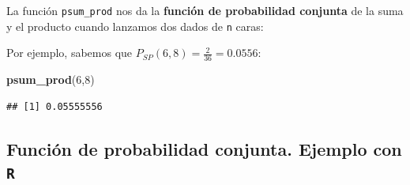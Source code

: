 \documentclass[]{book}
\newenvironment{Shaded}{\begin{snugshade}}{\end{snugshade}}
\newcommand{\ControlFlowTok}[1]{\textcolor[rgb]{0.13,0.29,0.53}{\textbf{#1}}}
\newcommand{\DataTypeTok}[1]{\textcolor[rgb]{0.13,0.29,0.53}{#1}}
\newcommand{\DecValTok}[1]{\textcolor[rgb]{0.00,0.00,0.81}{#1}}
\newcommand{\KeywordTok}[1]{\textcolor[rgb]{0.13,0.29,0.53}{\textbf{#1}}}
\newcommand{\NormalTok}[1]{#1}
\newcommand{\OperatorTok}[1]{\textcolor[rgb]{0.81,0.36,0.00}{\textbf{#1}}}
\newcommand{\StringTok}[1]{\textcolor[rgb]{0.31,0.60,0.02}{#1}}
\begin{document}
La función \texttt{psum\_prod} nos da la \textbf{función de probabilidad conjunta} de la suma y el producto cuando lanzamos dos dados de \texttt{n} caras:

\begin{Shaded}
\end{Shaded}

Por ejemplo, sabemos que \(P_{SP}(6,8)=\frac{2}{36}=0.0556\):

\begin{Shaded}
\begin{Highlighting}[]
\KeywordTok{psum_prod}\NormalTok{(}\DecValTok{6}\NormalTok{,}\DecValTok{8}\NormalTok{)}
\end{Highlighting}
\end{Shaded}

\begin{verbatim}
## [1] 0.05555556
\end{verbatim}

\hypertarget{funciuxf3n-de-probabilidad-conjunta.-ejemplo-con-r-3}{%
\subsection{\texorpdfstring{Función de probabilidad conjunta. Ejemplo con \texttt{R}}{Función de probabilidad conjunta. Ejemplo con R}}\label{funciuxf3n-de-probabilidad-conjunta.-ejemplo-con-r-3}}
\end{document}
